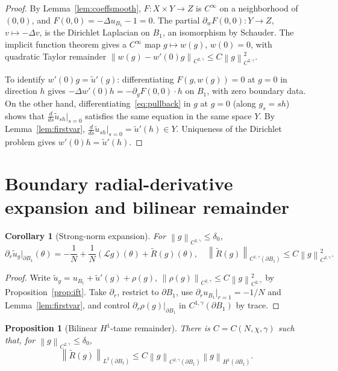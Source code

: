 \documentclass[11pt]{article}
\newtheorem{proposition}[theorem]{Proposition}
\newtheorem{corollary}[theorem]{Corollary}
\theoremstyle{definition}
\newcommand{\norm}[1]{\left\|#1\right\|}
\begin{document}
\begin{proof}
By Lemma~\ref{lem:coeffsmooth}, $F:X\times Y\to Z$ is $C^\infty$ on a
neighborhood of $(0,0)$, and $F(0,0)=-\Delta u_{B_1}-1=0$. The partial
$\partial_wF(0,0):Y\to Z$, $v\mapsto-\Delta v$, is the Dirichlet Laplacian
on $B_1$, an isomorphism by Schauder. The implicit function theorem gives a
$C^\infty$ map $g\mapsto w(g)$, $w(0)=0$, with quadratic Taylor remainder
$\norm{w(g)-w'(0)g}_{C^{2,\gamma}}\le C\norm{g}_{C^{2,\gamma}}^2$.

To identify $w'(0)g=\widetilde u'(g)$: differentiating $F(g,w(g))=0$ at
$g=0$ in direction $h$ gives
$-\Delta w'(0)h=-\partial_gF(0,0)\cdot h$ on $B_1$, with zero boundary data.
On the other hand, differentiating~\eqref{eq:pullback} in $g$ at $g=0$ (along
$g_s=sh$) shows that
$\frac{d}{ds}\widetilde u_{sh}\big|_{s=0}$ satisfies the same equation in the
same space $Y$. By Lemma~\ref{lem:firstvar},
$\frac{d}{ds}\widetilde u_{sh}\big|_{s=0}=\widetilde u'(h)\in Y$. Uniqueness
of the Dirichlet problem gives $w'(0)h=\widetilde u'(h)$.
\end{proof}

\section{Boundary radial-derivative expansion and bilinear remainder}\label{sec:bdy}

\begin{corollary}[Strong-norm expansion]\label{cor:dr}
For $\norm{g}_{C^{2,\gamma}}\le\delta_0$,
\[
\partial_r\widetilde u_g\big|_{\partial B_1}(\theta)
=-\frac{1}{N}+\frac{1}{N}(\mathcal L g)(\theta)+\widetilde R(g)(\theta),
\quad
\norm{\widetilde R(g)}_{C^{1,\gamma}(\partial B_1)}
\le C\norm{g}_{C^{2,\gamma}}^2.
\]
\end{corollary}

\begin{proof}
Write $\widetilde u_g=u_{B_1}+\widetilde u'(g)+\rho(g)$,
$\norm{\rho(g)}_{C^{2,\gamma}}\le C\norm{g}_{C^{2,\gamma}}^2$ by
Proposition~\ref{prop:ift}. Take $\partial_r$, restrict to $\partial B_1$,
use $\partial_r u_{B_1}\big|_{r=1}=-1/N$ and Lemma~\ref{lem:firstvar}, and
control $\partial_r\rho(g)\big|_{\partial B_1}$ in
$C^{1,\gamma}(\partial B_1)$ by trace.
\end{proof}

\begin{proposition}[Bilinear $H^1$-tame remainder]\label{prop:tame}
There is $C=C(N,\chi,\gamma)$ such that, for $\norm{g}_{C^{2,\gamma}}\le\delta_0$,
\begin{equation}\label{eq:Htame}
\norm{\widetilde R(g)}_{L^2(\partial B_1)}
\le C\norm{g}_{C^{2,\gamma}(\partial B_1)}\norm{g}_{H^1(\partial B_1)}.
\end{equation}
\end{proposition}
\end{document}
